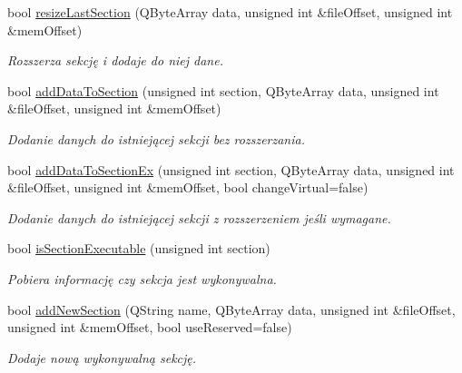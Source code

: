 \begin{DoxyCompactItemize}
bool \hyperlink{class_p_e_file_afa6e5d2b833b528707cc711912d79172}{resize\-Last\-Section} (Q\-Byte\-Array data, unsigned int \&file\-Offset, unsigned int \&mem\-Offset)
\begin{DoxyCompactList}\small\item\em Rozszerza sekcję i dodaje do niej dane. \end{DoxyCompactList}\item 
bool \hyperlink{class_p_e_file_ac2af0ea1633bb97beec46a898862880c}{add\-Data\-To\-Section} (unsigned int section, Q\-Byte\-Array data, unsigned int \&file\-Offset, unsigned int \&mem\-Offset)
\begin{DoxyCompactList}\small\item\em Dodanie danych do istniejącej sekcji bez rozszerzania. \end{DoxyCompactList}\item 
bool \hyperlink{class_p_e_file_ac0b05750bc440bb32cac22d0b1e0fece}{add\-Data\-To\-Section\-Ex} (unsigned int section, Q\-Byte\-Array data, unsigned int \&file\-Offset, unsigned int \&mem\-Offset, bool change\-Virtual=false)
\begin{DoxyCompactList}\small\item\em Dodanie danych do istniejącej sekcji z rozszerzeniem jeśli wymagane. \end{DoxyCompactList}\item 
bool \hyperlink{class_p_e_file_a13b95be1db5cb677e28c85b03f08e5c0}{is\-Section\-Executable} (unsigned int section)
\begin{DoxyCompactList}\small\item\em Pobiera informację czy sekcja jest wykonywalna. \end{DoxyCompactList}\item 
bool \hyperlink{class_p_e_file_ab2c5c7a95e9bcc5b5bc7da1042fb72ca}{add\-New\-Section} (Q\-String name, Q\-Byte\-Array data, unsigned int \&file\-Offset, unsigned int \&mem\-Offset, bool use\-Reserved=false)
\begin{DoxyCompactList}\small\item\em Dodaje nową wykonywalną sekcję. \end{DoxyCompactList}\end{DoxyCompactItemize}

